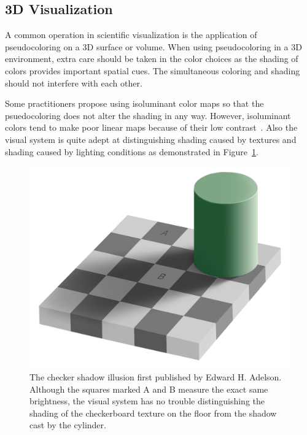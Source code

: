 \documentclass[letterpaper,twocolumn,fleqn]{article}
\newcommand*{\lcite}[1]{~\cite{#1}}
\begin{document}
\subsection{3D Visualization}

\noindent
A common operation in scientific visualization is the application of
pseudocoloring on a 3D surface or volume. When using pseudocoloring in a 3D
environment, extra care should be taken in the color choices as the shading
of colors provides important spatial cues. The simultaneous coloring and
shading should not interfere with each other.

Some practitioners propose using isoluminant color maps so that the
psuedocoloring does not alter the shading in any way. However, isoluminant
colors tend to make poor linear maps because of their low
contrast\lcite{Mullen1985,Rogowitz2001,Ware2004}. Also the visual system is
quite adept at distinguishing shading caused by textures and shading caused
by lighting conditions as demonstrated in
Figure~\ref{fig:CheckerShadowIllusion}.

\begin{figure}[htb]
  \centering
  \includegraphics[width=\linewidth]{images/CheckerShadowIllusion}
  \caption{The checker shadow illusion first published by Edward H.
    Adelson. Although the squares marked A and B measure the exact same
    brightness, the visual system has no trouble distinguishing the shading
    of the checkerboard texture on the floor from the shadow cast by the
    cylinder.}
  \label{fig:CheckerShadowIllusion}
\end{figure}
\end{document}
